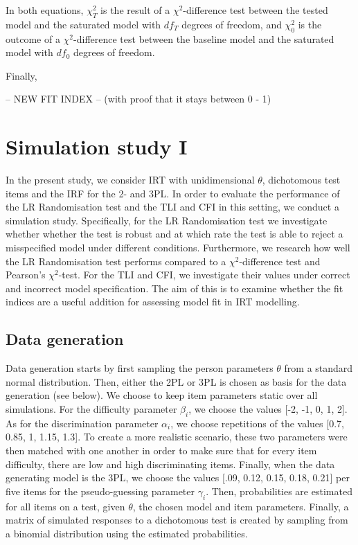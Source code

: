 \documentclass[Royal,sageapa,times,doublespace]{sagej}
\begin{document}
In both equations, $\chi^{2}_{T}$ is the result of a $\chi^2$-difference test between the tested model and the saturated model with $df_T$ degrees of freedom, and $\chi^{2}_{0}$ is the outcome of a $\chi^2$-difference test between the baseline model and the saturated model with $df_0$ degrees of freedom.

Finally, 

-- NEW FIT INDEX -- (with proof that it stays between 0 - 1)

\section{Simulation study I}

In the present study, we consider IRT with unidimensional $\theta$, dichotomous test items and the IRF for the 2- and 3PL. In order to evaluate the performance of the LR Randomisation test and the TLI and CFI in this setting, we conduct a simulation study. Specifically, for the LR Randomisation test we investigate whether whether the test is robust and at which rate the test is able to reject a misspecified model under different conditions. Furthermore, we research how well the LR Randomisation test performs compared to a $\chi^2$-difference test and Pearson's $\chi^2$-test. For the TLI and CFI, we investigate their values under correct and incorrect model specification. The aim of this is to examine whether the fit indices are a useful addition for assessing model fit in IRT modelling.

\subsection{Data generation}
Data generation starts by first sampling the person parameters $\theta$ from a standard normal distribution. Then, either the 2PL or 3PL is chosen as basis for the data generation (see below). We choose to keep item parameters static over all simulations. For the difficulty parameter $\beta_i$, we choose the values [-2, -1, 0, 1, 2]. As for the discrimination parameter $\alpha_i$, we choose repetitions of the values [0.7, 0.85, 1, 1.15, 1.3]. To create a more realistic scenario, these two parameters were then matched with one another in order to make sure that for every item difficulty, there are low and high discriminating items. Finally, when the data generating model is the 3PL, we choose the values [.09, 0.12, 0.15, 0.18, 0.21] per five items for the pseudo-guessing parameter $\gamma_i$. Then, probabilities are estimated for all items on a test, given $\theta$, the chosen model and item parameters. Finally, a matrix of simulated responses to a dichotomous test is created by sampling from a binomial distribution using the estimated probabilities. 
\end{document}
